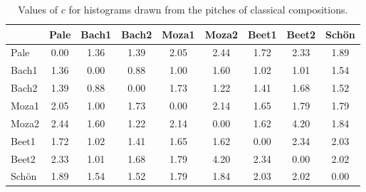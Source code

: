 \begin{table}[h!]
\begin{center}
\begin{tabular}{| l | c | c | c | c | c | c | c | c |}\hline
 & Pale & Bach1 & Bach2 & Moza1 & Moza2 & Beet1 & Beet2 & Sch\"on \\\hline
Pale & 0.00  & 1.36  & 1.39  & 2.05  & 2.44  & 1.72  & 2.33  & 1.89 \\\hline
Bach1 & 1.36  & 0.00  & 0.88  & 1.00  & 1.60  & 1.02  & 1.01  & 1.54 \\\hline
Bach2 & 1.39  & 0.88  & 0.00  & 1.73  & 1.22  & 1.41  & 1.68  & 1.52 \\\hline
Moza1 & 2.05  & 1.00  & 1.73  & 0.00  & 2.14  & 1.65  & 1.79  & 1.79 \\\hline
Moza2 & 2.44  & 1.60  & 1.22  & 2.14  & 0.00  & 1.62  & 4.20  & 1.84 \\\hline
Beet1 & 1.72  & 1.02  & 1.41  & 1.65  & 1.62  & 0.00  & 2.34  & 2.03 \\\hline
Beet2 & 2.33  & 1.01  & 1.68  & 1.79  & 4.20  & 2.34  & 0.00  & 2.02 \\\hline
Sch\"on & 1.89  & 1.54  & 1.52  & 1.79  & 1.84  & 2.03  & 2.02  & 0.00 \\\hline
\end{tabular}
\caption{Values of $c$ for histograms drawn from the pitches of classical compositions.}
\end{center}
\end{table}